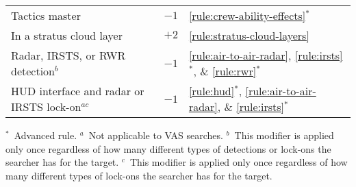 {\begin{twocolumntablefloat}
\begin{twocolumntable}
\begin{tabularx}{0.6\linewidth}{Xll}
Tactics master&$-1$&\ref{rule:crew-ability-effects}$^*$\\
In a stratus cloud layer&$+2$&\ref{rule:stratus-cloud-layers}\\
Radar, IRSTS, or RWR detection$^b$&$-1$&\ref{rule:air-to-air-radar}, \ref{rule:irsts}$^*$, \& \ref{rule:rwr}$^*$\\
HUD interface and radar or IRSTS lock-on$^{ac}$&$-1$& \ref{rule:hud}$^*$, \ref{rule:air-to-air-radar}, \& \ref{rule:irsts}$^*$\\
\bottomrule
\end{tabularx}
\begin{tablenote}{0.6\linewidth}
$^*$~Advanced rule. $^a$~Not applicable to VAS searches. $^b$~This modifier is applied only once regardless of how many different types of detections or lock-ons the searcher has for the target.  $^c$~This modifier is applied only once regardless of how many different types of lock-ons the searcher has for the target.
\end{tablenote}
\end{twocolumntable}


\end{twocolumntablefloat}
}
